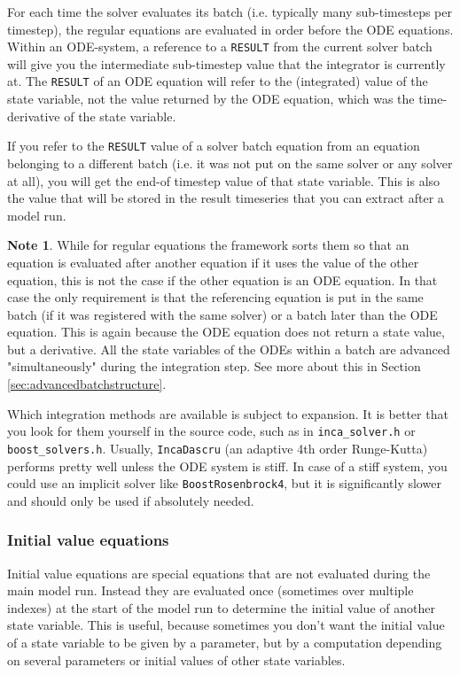 \documentclass[11pt]{article}
\theoremstyle{definition}
\newtheorem{mynote}{Note}
\newenvironment{note}%
  {\begin{lrbox}{\notebox}%
   \begin{minipage}{\dimexpr\linewidth-2\fboxsep}
   \begin{mynote}}%
  {\end{mynote}%
   \end{minipage}%
   \end{lrbox}%
   \begin{trivlist}
     \item[]\colorbox{silver}{\usebox\notebox}
   \end{trivlist}}
\begin{document}
For each time the solver evaluates its batch (i.e. typically many sub-timesteps per timestep), the regular equations are evaluated in order before the ODE equations. Within an ODE-system, a reference to a {\tt RESULT} from the current solver batch will give you the intermediate sub-timestep value that the integrator is currently at. The {\tt RESULT} of an ODE equation will refer to the (integrated) value of the state variable, not the value returned by the ODE equation, which was the time-derivative of the state variable.

If you refer to the {\tt RESULT} value of a solver batch equation from an equation belonging to a different batch (i.e. it was not put on the same solver or any solver at all), you will get the end-of timestep value of that state variable. This is also the value that will be stored in the result timeseries that you can extract after a model run.

\begin{note}
While for regular equations the framework sorts them so that an equation is evaluated after another equation if it uses the value of the other equation, this is not the case if the other equation is an ODE equation. In that case the only requirement is that the referencing equation is put in the same batch (if it was registered with the same solver) or a batch later than the ODE equation. This is again because the ODE equation does not return a state value, but a derivative. All the state variables of the ODEs within a batch are advanced "simultaneously" during the integration step. See more about this in Section \ref{sec:advancedbatchstructure}.
\end{note}

Which integration methods are available is subject to expansion. It is better that you look for them yourself in the source code, such as in {\tt inca\_solver.h} or {\tt boost\_solvers.h}. Usually, {\tt IncaDascru} (an adaptive 4th order Runge-Kutta) performs pretty well unless the ODE system is stiff. In case of a stiff system, you could use an implicit solver like {\tt BoostRosenbrock4}, but it is significantly slower and should only be used if absolutely needed.

\subsubsection{Initial value equations}

Initial value equations are special equations that are not evaluated during the main model run. Instead they are evaluated once (sometimes over multiple indexes) at the start of the model run to determine the initial value of another state variable. This is useful, because sometimes you don't want the initial value of a state variable to be given by a parameter, but by a computation depending on several parameters or initial values of other state variables.
\end{document}
